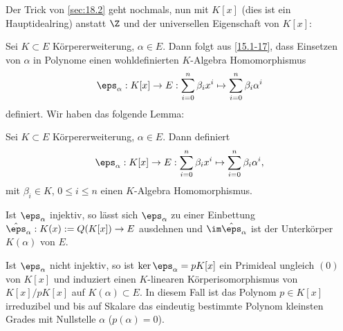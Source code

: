 Der Trick von \ref{sec:18.2} geht nochmals, nun mit $K[x]$ (dies ist ein Hauptidealring) anstatt $\Z$ und der universellen Eigenschaft von $K[x]$:

Sei $K \subset E$ Körpererweiterung, $\alpha \in E$.
Dann folgt aus \ref{15.1-17}, dass Einsetzen von $\alpha$ in Polynome einen wohldefinierten $K$-Algebra Homomorphismus
\[
	\eps_\alpha : K[x] \to E : \sum_{i=0}^n \beta_i x^i \mapsto \sum_{i=0}^n \beta_i \alpha^i
\]
definiert.
Wir haben das folgende Lemma:

\setcounter{thm}{0}
\begin{lem} \label{18.3-1}
	Sei $K \subset E$ Körpererweiterung, $\alpha \in E$.
	Dann definiert
	\[
		\eps_\alpha: K[x] \to E: \sum_{i=0}^n \beta_i x^i \mapsto \sum_{i=0}^n \beta_i \alpha^i,
	\]
	mit $\beta_i \in K$, $0 \le i \le n$ einen $K$-Algebra Homomorphismus.

	Ist $\eps_\alpha$ injektiv, so lässt sich $\eps_\alpha$ zu einer Einbettung $\hat \eps_\alpha: K(x) := Q(K[x]) \to E$ ausdehnen und $\im \hat \eps_\alpha$ ist der Unterkörper $K(\alpha)$ von $E$.

	Ist $\eps_\alpha$ nicht injektiv, so ist $\ker \eps_\alpha = pK[x]$ ein Primideal ungleich $(0)$ von $K[x]$ und induziert einen $K$-linearen Körperisomorphismus von $K[x] / pK[x]$ auf $K(\alpha) \subset E$.
	In diesem Fall ist das Polynom $p \in K[x]$ irreduzibel und bis auf Skalare das eindeutig bestimmte Polynom kleinsten Grades mit Nullstelle $\alpha$ ($p(\alpha) = 0$).
\end{lem}

